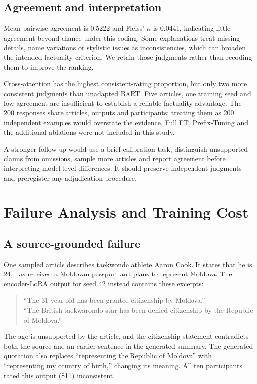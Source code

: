 \documentclass[11pt,letterpaper]{article}
\begin{document}
\subsection{Agreement and interpretation}
Mean pairwise agreement is 0.5222 and Fleiss' $\kappa$ is 0.0441, indicating little agreement beyond chance under this coding. Some explanations treat missing details, name variations or stylistic issues as inconsistencies, which can broaden the intended factuality criterion. We retain those judgments rather than recoding them to improve the ranking.

Cross-attention has the highest consistent-rating proportion, but only two more consistent judgments than unadapted BART. Five articles, one training seed and low agreement are insufficient to establish a reliable factuality advantage. The 200 responses share articles, outputs and participants; treating them as 200 independent examples would overstate the evidence. Full FT, Prefix-Tuning and the additional ablations were not included in this study.

A stronger follow-up would use a brief calibration task, distinguish unsupported claims from omissions, sample more articles and report agreement before interpreting model-level differences. It should preserve independent judgments and preregister any adjudication procedure.

\section{Failure Analysis and Training Cost}
\subsection{A source-grounded failure}
One sampled article describes taekwondo athlete Aaron Cook. It states that he is 24, has received a Moldovan passport and plans to represent Moldova. The encoder-LoRA output for seed 42 instead contains these excerpts:
\begin{quote}\small
``The 31-year-old has been granted citizenship by Moldova.''\\
``The British taekwarondo star has been denied citizenship by the Republic of Moldova.''
\end{quote}
The age is unsupported by the article, and the citizenship statement contradicts both the source and an earlier sentence in the generated summary. The generated quotation also replaces ``representing the Republic of Moldova'' with ``representing my country of birth,'' changing its meaning. All ten participants rated this output (S11) inconsistent.
\end{document}
